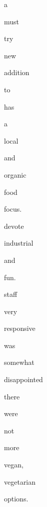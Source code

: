 \documentclass[varwidth]{standalone}
\begin{document}
 \begin{CJK*}{UTF8}{gbsn} 
{\setlength{\fboxsep}{0pt}\colorbox{white!0}{\parbox{0.9\textwidth}{
\colorbox{red!37.009925842285156}{\strut a} 
\colorbox{red!66.91350555419922}{\strut must} 
\colorbox{red!75.31464385986328}{\strut try} 
\colorbox{red!24.162107467651367}{\strut new} 
\colorbox{red!74.32669067382812}{\strut addition} 
\colorbox{red!100.0}{\strut to} 
\colorbox{red!85.81012725830078}{\strut has} 
\colorbox{red!99.29553985595703}{\strut a} 
\colorbox{red!74.80753326416016}{\strut local} 
\colorbox{red!73.82662963867188}{\strut and} 
\colorbox{red!45.57106018066406}{\strut organic} 
\colorbox{red!58.38809585571289}{\strut food} 
\colorbox{red!66.10420227050781}{\strut focus.} 
\colorbox{red!32.3618049621582}{\strut devote} 
\colorbox{red!31.5728816986084}{\strut industrial} 
\colorbox{red!8.916748046875}{\strut and} 
\colorbox{red!15.450273513793945}{\strut fun.} 
\colorbox{red!49.75332260131836}{\strut staff} 
\colorbox{red!30.558828353881836}{\strut very} 
\colorbox{red!18.40254783630371}{\strut responsive} 
\colorbox{red!67.46028900146484}{\strut was} 
\colorbox{red!38.977752685546875}{\strut somewhat} 
\colorbox{red!17.963016510009766}{\strut disappointed} 
\colorbox{red!35.55606460571289}{\strut there} 
\colorbox{red!0.0}{\strut were} 
\colorbox{red!54.70285415649414}{\strut not} 
\colorbox{red!95.69419860839844}{\strut more} 
\colorbox{red!57.35308074951172}{\strut vegan,} 
\colorbox{red!97.63165283203125}{\strut vegetarian} 
\colorbox{red!7.610903739929199}{\strut options.} 

}}}\end{CJK*}
\end{document}
